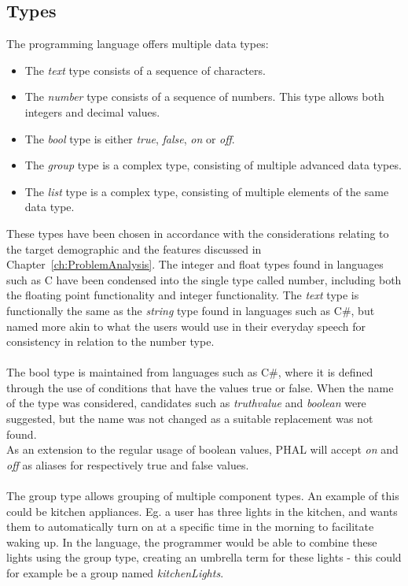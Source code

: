 \subsection{Types} \label{Def:Types}
The programming language offers multiple data types:
\begin{itemize}
    \item The \textit{text} type consists of a sequence of characters.
    \item The \textit{number} type consists of a sequence of numbers. This type allows both integers and decimal values. 
    \item The \textit{bool} type is either \textit{true}, \textit{false}, \textit{on} or \textit{off}.
    \item The \textit{group} type is a complex type, consisting of multiple advanced data types.
    \item The \textit{list} type is a complex type, consisting of multiple elements of the same data type.
\end{itemize}
These types have been chosen in accordance with the considerations relating to the target demographic and the features discussed in Chapter~\ref{ch:ProblemAnalysis}.
The integer and float types found in languages such as C have been condensed into the single type called number, including both the floating point functionality and integer functionality. 
The \textit{text} type is functionally the same as the \textit{string} type found in languages such as C\#, but named more akin to what the users would use in their everyday speech for consistency in relation to the number type. 
\\\\
The bool type is maintained from languages such as C\#, where it is defined through the use of conditions that have the values true or false. 
When the name of the type was considered, candidates such as \textit{truthvalue} and \textit{boolean} were suggested, but the name was not changed as a suitable replacement was not found.
\\
As an extension to the regular usage of boolean values, PHAL will accept \textit{on} and \textit{off} as aliases for respectively true and false values.
\\\\
The group type allows grouping of multiple component types. 
An example of this could be kitchen appliances. 
Eg. a user has three lights in the kitchen, and wants them to automatically turn on at a specific time in the morning to facilitate waking up. 
In the language, the programmer would be able to combine these lights using the group type, creating an umbrella term for these lights - this could for example be a group named \textit{kitchenLights}. 
